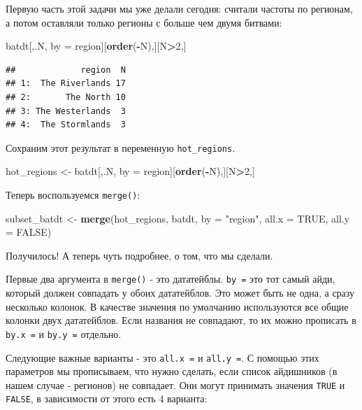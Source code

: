 \documentclass[]{book}
\newenvironment{Shaded}{\begin{snugshade}}{\end{snugshade}}
\newcommand{\KeywordTok}[1]{\textcolor[rgb]{0.13,0.29,0.53}{\textbf{#1}}}
\newcommand{\DataTypeTok}[1]{\textcolor[rgb]{0.13,0.29,0.53}{#1}}
\newcommand{\DecValTok}[1]{\textcolor[rgb]{0.00,0.00,0.81}{#1}}
\newcommand{\StringTok}[1]{\textcolor[rgb]{0.31,0.60,0.02}{#1}}
\newcommand{\OtherTok}[1]{\textcolor[rgb]{0.56,0.35,0.01}{#1}}
\newcommand{\OperatorTok}[1]{\textcolor[rgb]{0.81,0.36,0.00}{\textbf{#1}}}
\newcommand{\NormalTok}[1]{#1}
\begin{document}
Первую часть этой задачи мы уже делали сегодня: считали частоты по
регионам, а потом оставляли только регионы с больше чем двумя битвами:

\begin{Shaded}
\begin{Highlighting}[]
\NormalTok{batdt[,.N, by =}\StringTok{ }\NormalTok{region][}\KeywordTok{order}\NormalTok{(}\OperatorTok{-}\NormalTok{N),][N}\OperatorTok{>}\DecValTok{2}\NormalTok{,]}
\end{Highlighting}
\end{Shaded}

\begin{verbatim}
##             region  N
## 1:  The Riverlands 17
## 2:       The North 10
## 3: The Westerlands  3
## 4:  The Stormlands  3
\end{verbatim}

Сохраним этот результат в переменную \texttt{hot\_regions}.

\begin{Shaded}
\begin{Highlighting}[]
\NormalTok{hot_regions <-}\StringTok{ }\NormalTok{batdt[,.N, by =}\StringTok{ }\NormalTok{region][}\KeywordTok{order}\NormalTok{(}\OperatorTok{-}\NormalTok{N),][N}\OperatorTok{>}\DecValTok{2}\NormalTok{,]}
\end{Highlighting}
\end{Shaded}

Теперь воспользуемся \texttt{merge()}:

\begin{Shaded}
\begin{Highlighting}[]
\NormalTok{subset_batdt <-}\StringTok{ }\KeywordTok{merge}\NormalTok{(hot_regions, batdt, }
      \DataTypeTok{by =} \StringTok{"region"}\NormalTok{, }
      \DataTypeTok{all.x =} \OtherTok{TRUE}\NormalTok{, }\DataTypeTok{all.y =} \OtherTok{FALSE}\NormalTok{)}
\end{Highlighting}
\end{Shaded}

Получилось! А теперь чуть подробнее, о том, что мы сделали.

Первые два аргумента в \texttt{merge()} - это дататейблы. \texttt{by\ =}
это тот самый айди, который должен совпадать у обоих дататейблов. Это
может быть не одна, а сразу несколько колонок. В качестве значения по
умолчанию используются все общие колонки двух дататейблов. Если названия
не совпадают, то их можно прописать в \texttt{by.x\ =} и
\texttt{by.y\ =} отдельно.

Следующие важные варианты - это \texttt{all.x\ =} и \texttt{all.y\ =}. С
помощью этих параметров мы прописываем, что нужно сделать, если список
айдишников (в нашем случае - регионов) не совпадает. Они могут принимать
значения \texttt{TRUE} и \texttt{FALSE}, в зависимости от этого есть 4
варианта:
\end{document}
